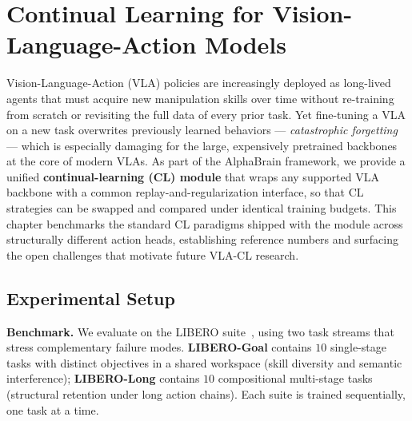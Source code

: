 \newcommand{\neutbd}{\textcolor{black!35}{--}} %
\newcommand{\rctbd}{\textcolor{black!35}{--}}  %
\newcommand{\pitbd}{\textcolor{black!35}{--}}  %

\section{Continual Learning for Vision-Language-Action Models}
\label{sec:cl}

Vision-Language-Action (VLA) policies are increasingly deployed as long-lived agents that must acquire new manipulation skills over time without re-training from scratch or revisiting the full data of every prior task. Yet fine-tuning a VLA on a new task overwrites previously learned behaviors --- \emph{catastrophic forgetting} --- which is especially damaging for the large, expensively pretrained backbones at the core of modern VLAs. As part of the AlphaBrain framework, we provide a unified \textbf{continual-learning (CL) module} that wraps any supported VLA backbone with a common replay-and-regularization interface, so that CL strategies can be swapped and compared under identical training budgets. This chapter benchmarks the standard CL paradigms shipped with the module across structurally different action heads, establishing reference numbers and surfacing the open challenges that motivate future VLA-CL research.

\subsection{Experimental Setup}
\label{sec:cl_setup}

\textbf{Benchmark.} We evaluate on the LIBERO suite~\citep{liu2023libero}, using two task streams that stress complementary failure modes. \textbf{LIBERO-Goal} contains $10$ single-stage tasks with distinct objectives in a shared workspace (skill diversity and semantic interference); \textbf{LIBERO-Long} contains $10$ compositional multi-stage tasks (structural retention under long action chains). Each suite is trained sequentially, one task at a time.

